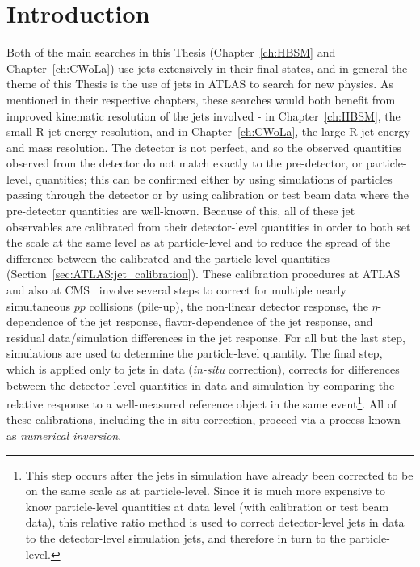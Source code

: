 \section{Introduction}
\label{sec:NI:intro}
Both of the main searches in this Thesis (Chapter~\ref{ch:HBSM} and Chapter~\ref{ch:CWoLa}) use jets extensively in their final states, and in general the theme of this Thesis is the use of jets in ATLAS to search for new physics.
As mentioned in their respective chapters, these searches would both benefit from improved kinematic resolution of the jets involved - in Chapter~\ref{ch:HBSM}, the small-R jet energy resolution, and in Chapter~\ref{ch:CWoLa}, the large-R jet energy and mass resolution.
The detector is not perfect, and so the observed quantities observed from the detector do not match exactly to the pre-detector, or particle-level, quantities;
this can be confirmed either by using simulations of particles passing through the detector or by using calibration or test beam data where the pre-detector quantities are well-known.
Because of this, all of these jet observables are calibrated from their detector-level quantities in order to both set the scale at the same level as at particle-level and to reduce the spread of the difference between the calibrated and the particle-level quantities (Section~\ref{sec:ATLAS:jet_calibration}).
These calibration procedures at ATLAS~\cite{PERF-2016-04,Aad:2011he} and also at CMS~\cite{Chatrchyan:2011ds,Khachatryan:2016kdb} involve several steps to correct for multiple nearly simultaneous $pp$ collisions (pile-up), the non-linear detector response, the $\eta$-dependence of the jet response, flavor-dependence of the jet response, and residual data/simulation differences in the jet response.
For all but the last step, simulations are used to determine the particle-level quantity.
The final step, which is applied only to jets in data (\textit{in-situ} correction), corrects for differences between the detector-level quantities in data and simulation by comparing the relative response to a well-measured reference object in the same event\footnote{This step occurs after the jets in simulation have already been corrected to be on the same scale as at particle-level. Since it is much more expensive to know particle-level quantities at data level (with calibration or test beam data), this relative ratio method is used to correct detector-level jets in data to the detector-level simulation jets, and therefore in turn to the particle-level.}. 
All of these calibrations, including the in-situ correction, proceed via a process known as \textit{numerical inversion}.

